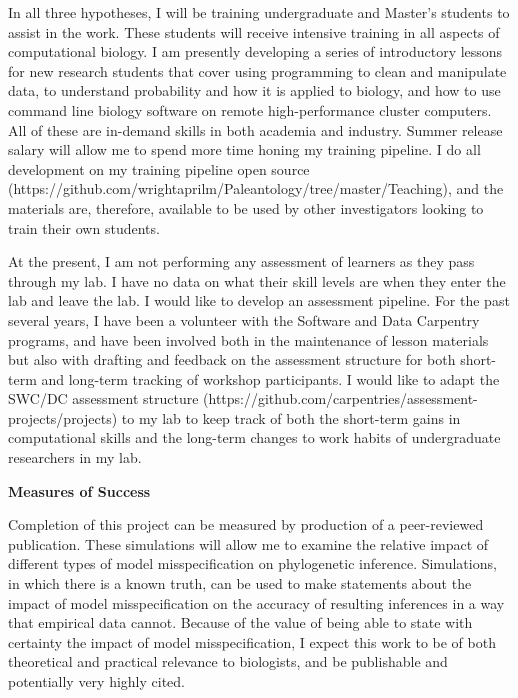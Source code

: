 \documentclass[12pt]{article}
\begin{document}
In all three hypotheses, I will be training undergraduate and Master's students to assist in the work.
These students will receive intensive training in all aspects of computational biology. 
I am presently developing a series of introductory lessons for new research students that cover using programming to clean and manipulate data, to understand probability and how it is applied to biology, and how to use command line biology software on remote high-performance cluster computers.
All of these are in-demand skills in both academia and industry. 
Summer release salary will allow me to spend more time honing my training pipeline.
I do all development on my training pipeline open source (https://github.com/wrightaprilm/Paleantology/tree/master/Teaching), and the materials are, therefore, available to be used by other investigators looking to train their own students. \par
At the present, I am not performing any assessment of learners as they pass through my lab.
I have no data on what their skill levels are when they enter the lab and leave the lab.
I would like to develop an assessment pipeline.
For the past several years, I have been a volunteer with the Software and Data Carpentry programs, and have been involved both in the maintenance of lesson materials but also with drafting and feedback on the assessment structure for both short-term and long-term tracking of workshop participants.
I would like to adapt the SWC/DC assessment structure (https://github.com/carpentries/assessment-projects/projects) to my lab to keep track of both the short-term gains in computational skills and the long-term changes to work habits of undergraduate researchers in my lab. \par

\textbf{Measures of Success} \par
Completion of this project can be measured by production of a peer-reviewed publication.
These simulations will allow me to examine the relative impact of different types of model misspecification on phylogenetic inference. 
Simulations, in which there is a known truth, can be used to make statements about the impact of model misspecification on the accuracy of resulting inferences in a way that empirical data cannot.
Because of the value of being able to state with certainty the impact of model misspecification, I expect this work to be of both theoretical and practical relevance to biologists, and be publishable and potentially very highly cited. 
\par
\end{document}
